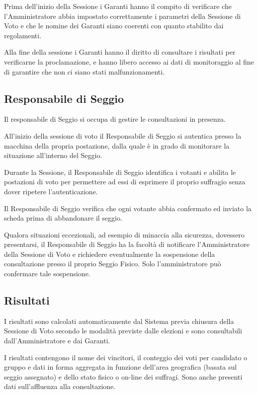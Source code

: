 \documentclass{report}
\begin{document}
Prima dell'inizio della Sessione i Garanti hanno il compito di verificare che l'Amministratore abbia impostato correttamente i parametri della Sessione di Voto e che le nomine dei Garanti siano coerenti con quanto stabilito dai regolamenti.

Alla fine della sessione i Garanti hanno il diritto di consultare i risultati per verificarne la proclamazione, e hanno libero accesso ai dati di monitoraggio al fine di garantire che non ci siano stati malfunzionamenti.


\subsection{Responsabile di Seggio}
Il responsabile di Seggio si occupa di gestire le consultazioni in presenza. 

All'inizio della sessione di voto il Responsabile di Seggio si autentica presso la macchina della propria postazione, dalla quale è in grado di monitorare la situazione all'interno del Seggio.

Durante la Sessione, il Responsabile di Seggio identifica i votanti e abilita le postazioni di voto per permettere ad essi di esprimere il proprio suffragio senza dover ripetere l'autenticazione.

Il Responsabile di Seggio verifica che ogni votante abbia confermato ed inviato la scheda prima di abbandonare il seggio.

Qualora situazioni eccezionali, ad esempio di minaccia alla sicurezza, dovessero presentarsi, il Responsabile di Seggio ha la facoltà di notificare l'Amministratore della Sessione di Voto e richiedere eventualmente la sospensione della consultazione presso il proprio Seggio Fisico. Solo l'amministratore può confermare tale sospensione.


\subsection{Risultati}
I risultati sono calcolati automaticamente dal Sistema previa chiusura della Sessione di Voto secondo le modalità previste dalle elezioni e sono consultabili dall'Amministratore e dai Garanti.

I risultati contengono il nome dei vincitori, il conteggio dei voti per candidato o gruppo e dati in forma aggregata in funzione dell'area geografica (basata sul seggio assegnato) e dello stato fisico o on-line dei suffragi. Sono anche presenti dati sull'affluenza alla consultazione.
\end{document}
